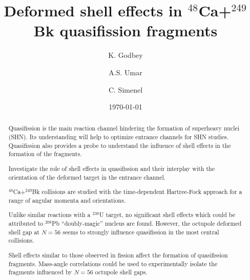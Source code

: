 \documentclass[reprint,aps,prc,twocolumn,floatfix,10pt]{revtex4-2}
\begin{document}
\title{Deformed shell effects in $^{48}$Ca+$^{249}$Bk quasifission fragments}

\author{K. Godbey}
\author{A.S. Umar}
\author{C. Simenel}
\date{\today}


\begin{abstract}
\edef\oldrightskip{\the\rightskip}
\begin{description}
\rightskip\oldrightskip\relax
\setlength{\parskip}{0pt} %
\item[Background] Quasifission is the main reaction channel hindering the formation of superheavy nuclei (SHN). Its understanding will help to optimize entrance channels for SHN studies. Quasifission also provides a probe to understand the influence of shell effects in the formation of the fragments.
\item[Purpose] Investigate the role of shell effects in quasifission and their interplay with the orientation of the deformed target in the entrance channel.
\item[Methods] $^{48}$Ca$+^{249}$Bk collisions are studied with the time-dependent Hartree-Fock approach for a range of angular momenta and orientations.
\item[Results] Unlike similar reactions with a $^{238}$U target, no significant shell effects which could be attributed to $^{208}$Pb ``doubly-magic'' nucleus are found. However, the octupole deformed shell gap at $N=56$ seems to strongly influence quasifission in the most central collisions.
\item[Conclusions] Shell effects similar to those observed in fission affect the formation of quasifission fragments. Mass-angle correlations could be used to experimentally isolate the fragments influenced by $N=56$ octupole shell gaps.
\end{description}
\end{abstract}
\maketitle
\end{document}
